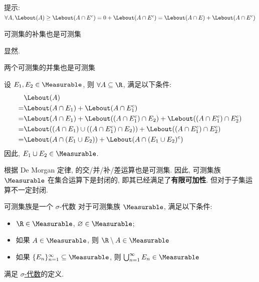 \begin{prf}
    提示: \(\forall A, \Lebout(A)\geq\Lebout(A\cap E^c)=0+\Lebout(A\cap E^c)=\Lebout(A\cap E)+\Lebout(A\cap E^c) \)
\end{prf}
\begin{ppt}
    {可测集的补集也是可测集}
\end{ppt}
\begin{prf}
    显然.
\end{prf}
\begin{ppt}
    {两个可测集的并集也是可测集}
\end{ppt}
\begin{prf}
    设 \(E_1,E_2\in\Measurable\), 则 \(\forall A\subseteq\R\), 满足以下条件:
    \begin{align*}
        &\Lebout(A) \\
        =& \Lebout(A\cap E_1) + \Lebout(A\cap E_1^c) \\
        =& \Lebout(A\cap E_1) + \Lebout((A\cap E_1^c)\cap E_2) + \Lebout((A\cap E_1^c)\cap E_2^c) \\
        =& \Lebout((A\cap E_1)\cup((A\cap E_1^c)\cap E_2)) + \Lebout((A\cap E_1^c)\cap E_2^c) \\
        =& \Lebout(A\cap(E_1\cup E_2)) + \Lebout(A\cap(E_1\cup E_2)^c)
    \end{align*}
    因此, \(E_1\cup E_2\in\Measurable\).
\end{prf}
\begin{rmk}
    根据 De Morgan 定律, \MeasurableSet{}的交/并/补/差运算也是可测集. 因此, 可测集族 \(\Measurable\) 在集合运算下是封闭的, 即其已经满足了\textbf{有限可加性}. 但对于子集运算不一定封闭.
\end{rmk}
\begin{thm}
    {可测集族是一个 \(\sigma\)-代数}
    对于可测集族 \(\Measurable\), 满足以下条件:
    \begin{itemize}
        \item \(\R\in\Measurable\), \(\varnothing\in\Measurable\);
        \item 如果 \(A\in\Measurable\), 则 \(\R\setminus A\in\Measurable\)
        \item 如果 \(\{E_n\}_{n=1}^\infty \subseteq \Measurable\), 则 \(\bigcup_{n=1}^\infty E_n \in \Measurable\)
    \end{itemize}
    满足 \hyperref[dfn:sigma-algebra]{\(\sigma\)-代数}的定义.
\end{thm}
